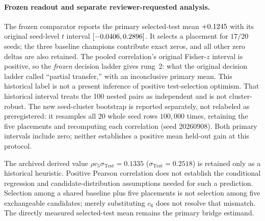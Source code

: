 \paragraph{Frozen readout and separate reviewer-requested analysis.}
The frozen comparator reports the primary selected-test mean
$+0.1245$ with its original seed-level $t$ interval
$[-0.0406,0.2896]$. It selects a placement for $17/20$ seeds;
the three baseline champions contribute exact zeros, and all other zero
deltas are also retained. The pooled correlation's original Fisher-$z$
interval is positive, so the \emph{frozen} decision ladder gives rung~2:
what the original decision ladder called ``partial transfer,'' with an
inconclusive primary mean. This historical label is not a present inference
of positive test-selection optimism. That historical interval
treats the 100 nested pairs as independent and is not cluster-robust.
The new seed-cluster bootstrap is reported separately, not relabeled as
preregistered: it resamples all 20 whole seed rows $100{,}000$ times, retaining
the five placements and recomputing each correlation (seed $20260908$).
Both primary intervals include zero; neither establishes a positive mean
held-out gain at this protocol.

The archived derived value $\rho c_5\sigma_{\mathrm{Test}}=0.1335$
($\sigma_{\mathrm{Test}}=0.2518$) is retained only as a historical heuristic.
Positive Pearson correlation does not establish the conditional regression
and candidate-distribution assumptions needed for such a prediction.
Selection among a shared baseline plus five placements is not selection
among five exchangeable candidates; merely substituting $c_6$ does not
resolve that mismatch. The directly measured selected-test mean remains
the primary bridge estimand.

